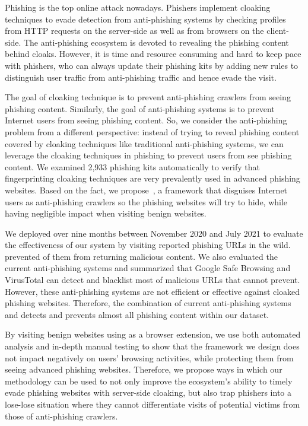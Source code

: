 Phishing is the top online attack nowadays.
Phishers implement cloaking techniques to evade detection from anti-phishing systems
by checking profiles from HTTP requests on the server-side as well as from browsers on the client-side.
The anti-phishing ecosystem is devoted to revealing the phishing content behind cloaks.
However, it is time and resource consuming and hard to keep pace with phishers, who can always update their phishing kits by adding new rules to distinguish user traffic from anti-phishing traffic and hence evade the visit.

The goal of cloaking technique is to prevent anti-phishing crawlers from seeing phishing content. 
Similarly, the goal of anti-phishing systems is to prevent Internet users from seeing phishing content.
So, we consider the anti-phishing problem from a different perspective:
instead of trying to reveal phishing content covered by cloaking techniques like traditional anti-phishing systems, we can leverage the cloaking techniques in phishing to prevent users from see phishing content.
We examined 2,933 phishing kits automatically to verify that fingerprinting cloaking techniques are very prevalently used in advanced phishing websites.
Based on the fact, we propose~\spartacus, a framework that disguises Internet users as anti-phishing crawlers
so the phishing websites will try to hide,
while having negligible impact when visiting benign websites.



We deployed \spartacus over nine months between November 2020 and July 2021 to evaluate the effectiveness of our system by visiting \totalphishing reported phishing URLs in the wild.
\spartacus prevented \evadedphishing of them from returning malicious content.
We also evaluated the current anti-phishing systems and summarized that Google Safe Browsing and VirusTotal can detect and blacklist most of malicious URLs that \spartacus cannot prevent.
However, these anti-phishing systems are not efficient or effective against cloaked phishing websites.
Therefore, the combination of current anti-phishing systems and \spartacus detects and prevents almost all phishing content within our dataset.

By visiting benign websites using \spartacus as a browser extension, we use both automated analysis and in-depth manual testing to show that the framework we design does not impact negatively on users' browsing activities, while protecting them from seeing advanced phishing websites.
Therefore, we propose ways in which our methodology can be used to not only improve the ecosystem’s ability to timely evade phishing websites with server-side cloaking, but also trap phishers into a lose-lose situation where they cannot differentiate visits of potential victims from those of anti-phishing crawlers.
